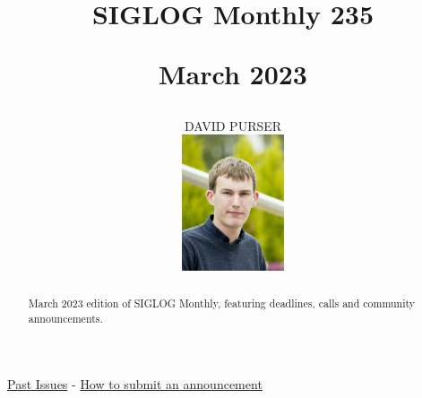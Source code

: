 \documentclass[prodmode,acmtecs]{acmsmall} %
\newcounter{colstart}
\begin{document}
\setcounter{colstart}{\thepage}

\title{{\huge\sc SIGLOG Monthly 235}

 March 2023}
\author{DAVID PURSER
\vspace*{-2.6cm}\begin{flushright}\includegraphics[width=30mm]{dp}\end{flushright}
}

\begin{abstract}
March 2023 edition of SIGLOG Monthly, featuring deadlines, calls and community announcements.
\end{abstract}


\maketitlee

\href{https://lics.siglog.org/newsletters/}{Past Issues}
 - 
\href{https://lics.siglog.org/newsletters/inst.html}{How to submit an announcement}
\end{document}
